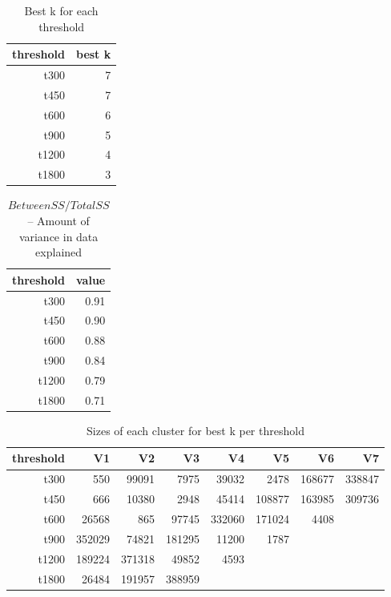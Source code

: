 \begin{table}[!ht]
\centering
\begin{tabular}{rr}
  \hline
 threshold & best k \\
  \hline
t300 &   7 \\
  t450 &   7 \\
  t600 &   6 \\
  t900 &   5 \\
  t1200 &   4 \\
  t1800 &   3 \\
   \hline
\end{tabular}
\caption{Best k for each threshold}
\end{table}

\begin{table}[ht]
\centering
\begin{tabular}{rr}
  \hline
 threshold & value \\
  \hline
t300 & 0.91 \\
  t450 & 0.90 \\
  t600 & 0.88 \\
  t900 & 0.84 \\
  t1200 & 0.79 \\
  t1800 & 0.71 \\
   \hline
\end{tabular}
\caption{$BetweenSS / TotalSS$ -- Amount of variance in data explained}
\end{table}

\begin{table}[ht]
\centering
\begin{tabular}{rrrrrrrr}
  \hline
 threshold & V1 & V2 & V3 & V4 & V5 & V6 & V7 \\
  \hline
t300 & 550 & 99091 & 7975 & 39032 & 2478 & 168677 & 338847 \\
  t450 & 666 & 10380 & 2948 & 45414 & 108877 & 163985 & 309736 \\
  t600 & 26568 & 865 & 97745 & 332060 & 171024 & 4408 &  \\
  t900 & 352029 & 74821 & 181295 & 11200 & 1787 &  &  \\
  t1200 & 189224 & 371318 & 49852 & 4593 &  &  &  \\
  t1800 & 26484 & 191957 & 388959 &  &  &  &  \\
   \hline
\end{tabular}
\caption{Sizes of each cluster for best k per threshold}
\end{table}

